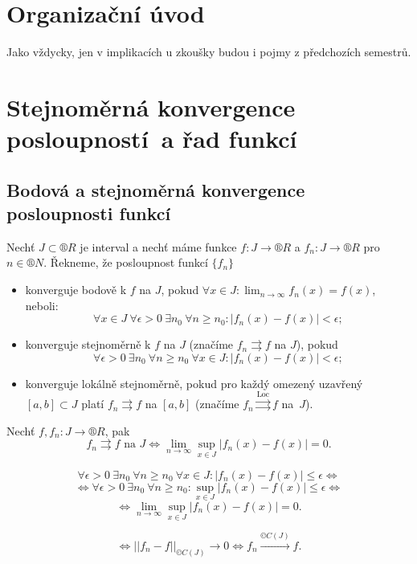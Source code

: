 \documentclass[12pt]{article}					%
\begin{document}
\section*{Organizační úvod}
\begin{poznamka}
	Jako vždycky, jen v implikacích u zkoušky budou i pojmy z předchozích semestrů.
\end{poznamka}

\section{Stejnoměrná konvergence posloupností a řad funkcí}
	\subsection{Bodová a stejnoměrná konvergence posloupnosti funkcí}
	\begin{definice}
		Nechť $J \subset ®R$ je interval a nechť máme funkce $f: J \rightarrow ®R$ a $f_n: J \rightarrow ®R$ pro $n \in ®N$. Řekneme, že posloupnost funkcí $\{f_n\}$

		\begin{itemize}
			\item konverguje bodově k $f$ na $J$, pokud $\forall x \in J: \lim_{n \rightarrow ∞} f_n(x) = f(x)$, neboli:
				$$ \forall x \in J\ \forall \epsilon > 0\ \exists n_0\ \forall n ≥ n_0: |f_n(x) - f(x)| < \epsilon; $$
			\item konverguje stejnoměrně k $f$ na $J$ (značíme $f_n \rightrightarrows f$ na $J$), pokud
				$$ \forall \epsilon > 0\ \exists n_0\ \forall n ≥ n_0\ \forall x \in J: |f_n(x) - f(x)| < \epsilon; $$
			\item konverguje lokálně stejnoměrně, pokud pro každý omezený uzavřený $[a, b] \subset J$ platí $f_n \rightrightarrows f$ na $[a, b]$ (značíme $f_n \overset{\text{Loc}}{\rightrightarrows} f$ na $J$).
		\end{itemize}
	\end{definice}

	\begin{veta}
		Nechť $f, f_n: J \rightarrow ®R$, pak
		$$ f_n \rightrightarrows f \text{ na } J \Leftrightarrow \lim_{n \rightarrow ∞} \sup_{x \in J} |f_n(x) - f(x)| = 0. $$

		\begin{dukazin}
			$$ \forall \epsilon > 0\ \exists n_0\ \forall n ≥ n_0\ \forall x \in J: |f_n(x) - f(x)| ≤ \epsilon \Leftrightarrow $$
			$$ \Leftrightarrow \forall \epsilon > 0\ \exists n_0\ \forall n ≥ n_0: \sup_{x \in J} |f_n(x) - f(x)| ≤ \epsilon \Leftrightarrow $$
			$$ \Leftrightarrow \lim_{n \rightarrow ∞} \sup_{x \in J} |f_n(x) - f(x)| = 0. $$
		\end{dukazin}

		\begin{poznamkain}
			$$ \Leftrightarrow ||f_n - f||_{©C(J)} \rightarrow 0 \Leftrightarrow f_n \overset{©C(J)} \rightarrow f. $$
		\end{poznamkain}
	\end{veta}
\end{document}
